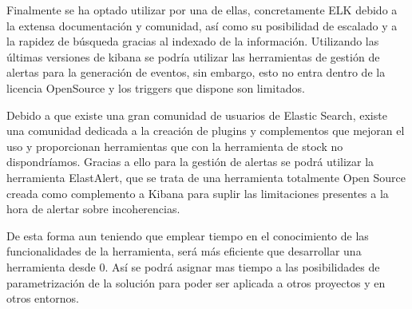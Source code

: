 Finalmente se ha optado utilizar por una de ellas, concretamente ELK debido a la extensa documentación y comunidad, así como su posibilidad de escalado y a la rapidez de búsqueda gracias al indexado de la información. Utilizando las últimas versiones de kibana se podría utilizar las herramientas de gestión de alertas para la generación de eventos, sin embargo, esto no entra dentro de la licencia OpenSource y los triggers que dispone son limitados. 

Debido a que existe una gran comunidad de usuarios de Elastic Search, existe una comunidad dedicada a la creación de plugins y complementos que mejoran el uso y proporcionan herramientas que con la herramienta de stock no dispondríamos. Gracias a ello para la gestión de alertas se podrá utilizar la herramienta ElastAlert, que se trata de una herramienta totalmente Open Source creada como complemento a Kibana para suplir las limitaciones presentes a la hora de alertar sobre incoherencias.

De esta forma aun teniendo que emplear tiempo en el conocimiento de las funcionalidades de la herramienta, será más eficiente que desarrollar una herramienta desde 0. Así se podrá asignar mas tiempo a las posibilidades de parametrización de la solución para poder ser aplicada a otros proyectos y en otros entornos.

